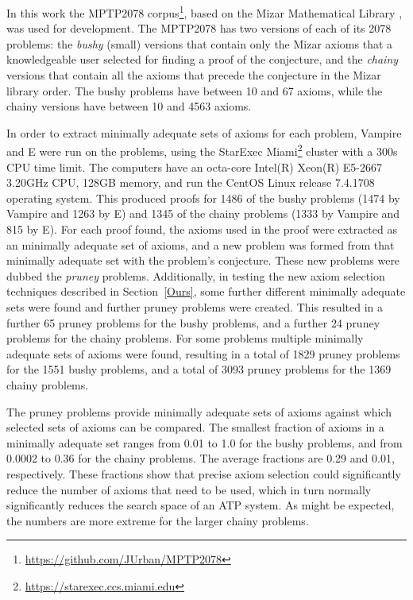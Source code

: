 \documentclass[]{ceurart}
\begin{document}
In this work the MPTP2078 corpus\footnote{%
\url{https://github.com/JUrban/MPTP2078}}, based on the Mizar Mathematical
Library \cite{Rud92}, was used for development.
The MPTP2078 has two versions of each of its 2078 problems: 
the \emph{bushy} (small) versions that contain only the Mizar axioms that a
knowledgeable user selected for finding a proof of the conjecture, and 
the \emph{chainy} versions that contain all the axioms that precede the 
conjecture in the Mizar library order.
The bushy problems have between 10 and 67 axioms, while the chainy versions
have between 10 and 4563 axioms.

In order to extract minimally adequate sets of axioms for each problem, Vampire
and E \cite{SCV19} were run on the problems, using the StarExec \cite{SST14}
Miami\footnote{%
\url{https://starexec.ccs.miami.edu}}
cluster with a 300s CPU time limit.
The computers have an octa-core Intel(R) Xeon(R) E5-2667 3.20GHz CPU,
128GB memory, and run the CentOS Linux release 7.4.1708 operating system.
This produced proofs for 1486 of the bushy problems (1474 by Vampire and 1263
by E) and 1345 of the chainy problems (1333 by Vampire and 815 by E).
For each proof found, the axioms used in the proof were extracted as an
minimally adequate set of axioms, and a new problem was formed from that 
minimally adequate set with the problem's conjecture.
These new problems were dubbed the \emph{pruney} problems.
Additionally, in testing the new axiom selection techniques described in 
Section~\ref{Ours}, some further different minimally adequate sets were found 
and further pruney problems were created.
This resulted in a further 65 pruney problems for the bushy problems, and
a further 24 pruney problems for the chainy problems.
For some problems multiple minimally adequate sets of axioms were found, 
resulting in a total of 1829 pruney problems for the 1551 bushy problems, 
and a total of 3093 pruney problems for the 1369 chainy problems.

The pruney problems provide minimally adequate sets of axioms against which
selected sets of axioms can be compared.
The smallest fraction of axioms in a minimally adequate set ranges from 
0.01 to 1.0 for the bushy problems, and from 0.0002 to 0.36 for the chainy 
problems.
The average fractions are 0.29 and 0.01, respectively.
These fractions show that precise axiom selection could significantly reduce 
the number of axioms that need to be used, which in turn normally 
significantly reduces the search space of an ATP system.
As might be expected, the numbers are more extreme for the larger chainy 
problems.
\end{document}
